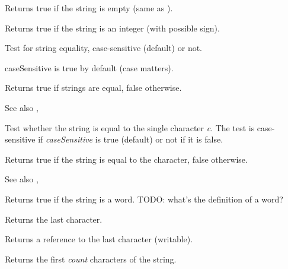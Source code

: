
Returns true if the string is empty (same as ).

\label{wxstringisnumber}


Returns true if the string is an integer (with possible sign).

\label{wxstringissameas}


Test for string equality, case-sensitive (default) or not.

caseSensitive is true by default (case matters).

Returns true if strings are equal, false otherwise.

See also , 


Test whether the string is equal to the single character {\it c}. The test is
case-sensitive if {\it caseSensitive} is true (default) or not if it is false.

Returns true if the string is equal to the character, false otherwise.

See also , 

\label{wxstringisword}


Returns true if the string is a word. TODO: what's the definition of a word?

\label{wxstringlast}


Returns the last character.


Returns a reference to the last character (writable).

\label{wxstringleft}


Returns the first {\it count} characters of the string.

